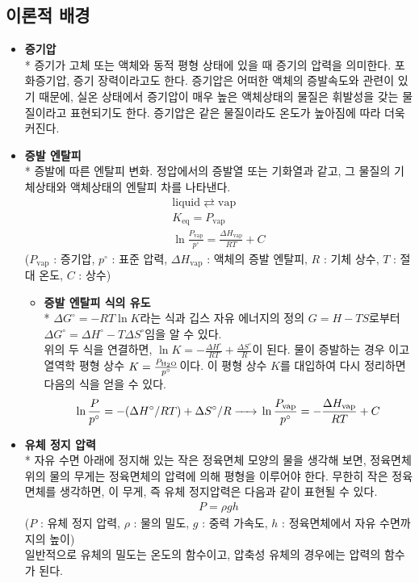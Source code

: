 \documentclass[a4paper,10pt]{article}
\begin{document}
	\subsection{이론적 배경}
	\begin{itemize}
		\item {\bf 증기압} \\*
		증기가 고체 또는 액체와 동적 평형 상태에 있을 때 증기의 압력을 의미한다. 포화증기압, 증기 장력이라고도 한다. 증기압은 어떠한 액체의 증발속도와 관련이 있기 때문에, 실온 상태에서 증기압이 매우 높은 액체상태의 물질은 휘발성을 갖는 물질이라고 표현되기도 한다. 증기압은 같은 물질이라도 온도가 높아짐에 따라 더욱 커진다.
		\item {\bf 증발 엔탈피} \\*
		증발에 따른 엔탈피 변화. 정압에서의 증발열 또는 기화열과 같고, 그 물질의 기체상태와 액체상태의 엔탈피 차를 나타낸다.
		\begin{gather*}
			\mathrm{liquid} \rightleftarrows \mathrm{vap} \\
			K_{\mathrm{eq}} = P_{\mathrm{vap}} \\
			\ln \frac{P_{\mathrm{vap}}}{p^{\circ}} = \frac{\Delta H_{\mathrm{vap}}}{RT} + C
		\end{gather*}
		($P_{\mathrm{vap}}$ : 증기압, $p^{\circ}$ : 표준 압력, $\Delta H_{\mathrm{vap}}$ : 액체의 증발 엔탈피, $R$ : 기체 상수, $T$ : 절대 온도, $C$ : 상수)
		\begin{itemize}
			\item {\bf 증발 엔탈피 식의 유도} \\*
			$\Delta G^{\circ} = -RT \ln K$라는 식과 깁스 자유 에너지의 정의 $G = H - TS$로부터 $\Delta G^{\circ} = \Delta H^{\circ} - T \Delta S^{\circ}$임을 알 수 있다. \\
			위의 두 식을 연결하면, $\ln K = -\frac{\Delta H^{\circ}}{RT} + \frac{\Delta S^{\circ}}{R}$이 된다.
			물이 증발하는 경우 이고 열역학 평형 상수 $K = \frac{P_{\ce{H_{2}O}}}{p^{\circ}}$이다. 이 평형 상수 $K$를 대입하여 다시 정리하면 다음의 식을 얻을 수 있다.
			\begin{gather*}
				\ln \frac{P}{p^{\circ}} = -(\Delta H^{\circ}/RT) + \Delta S^{\circ}/R \ce{->} \ln \frac{P_{\mathrm{vap}}}{p^{\circ}} = -\frac{\Delta H_{\mathrm{vap}}}{RT} + C
			\end{gather*}
		\end{itemize}
		\item {\bf 유체 정지 압력} \\*
		자유 수면 아래에 정지해 있는 작은 정육면체 모양의 물을 생각해 보면, 정육면체 위의 물의 무게는 정육면체의 압력에 의해 평형을 이루어야 한다. 무한히 작은 정육면체를 생각하면, 이 무게, 즉 유체 정지압력은 다음과 같이 표현될 수 있다.
		\begin{gather*}
			P = \rho gh
		\end{gather*}
		($P$ : 유체 정지 압력, $\rho$ : 물의 밀도, $g$ : 중력 가속도, $h$ : 정육면체에서 자유 수면까지의 높이) \\
		일반적으로 유체의 밀도는 온도의 함수이고, 압축성 유체의 경우에는 압력의 함수가 된다.
	\end{itemize}
	
\end{document}
